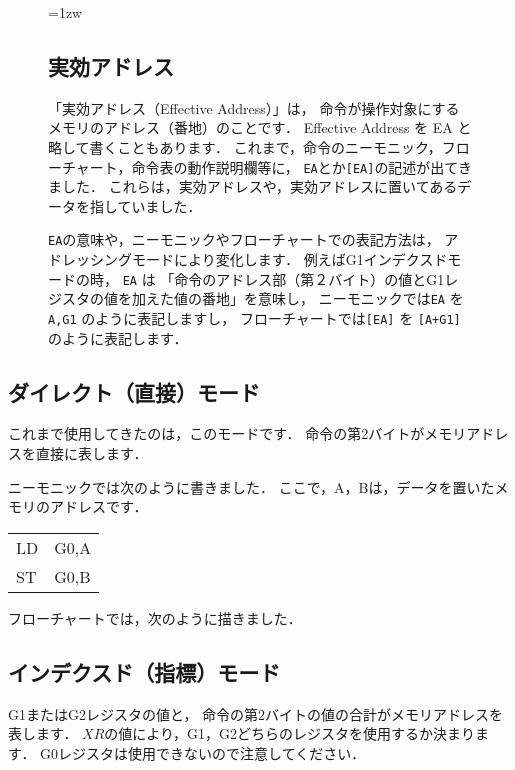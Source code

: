 \begin{figure}[btp]
\begin{framed}{\parindent=1zw
\subsection*{実効アドレス}
「実効アドレス（Effective Address）」は，
命令が操作対象にするメモリのアドレス（番地）のことです．
Effective Address を EA と略して書くこともあります．
これまで，命令のニーモニック，フローチャート，命令表の動作説明欄等に，
{\tt EA}とか{\tt [EA]}の記述が出てきました．
これらは，実効アドレスや，実効アドレスに置いてあるデータを指していました．

{\tt EA}の意味や，ニーモニックやフローチャートでの表記方法は，
アドレッシングモードにより変化します．
例えばG1インデクスドモードの時，
{\tt EA} は
「命令のアドレス部（第２バイト）の値とG1レジスタの値を加えた値の番地」を意味し，
ニーモニックでは{\tt EA} を {\tt A,G1} のように表記しますし，
フローチャートでは{\tt [EA]} を {\tt [A+G1]} のように表記します．
}\end{framed}
\end{figure}

\subsection{ダイレクト（直接）モード}
これまで使用してきたのは，このモードです．
命令の第2バイトがメモリアドレスを直接に表します．

ニーモニックでは次のように書きました．
ここで，A，Bは，データを置いたメモリのアドレスです．

{\tt\begin{center}
\begin{tabular}{l l}
LD & G0,A \\
ST & G0,B \\
\end{tabular}
\end{center}}

フローチャートでは，次のように描きました．

\begin{center}
\end{center}

\subsection{インデクスド（指標）モード}
G1またはG2レジスタの値と，
命令の第2バイトの値の合計がメモリアドレスを表します．
$XR$の値により，G1，G2どちらのレジスタを使用するか決まります．
G0レジスタは使用できないので注意してください．

